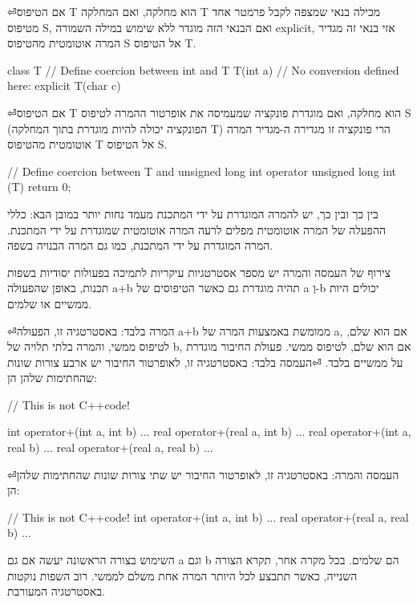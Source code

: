   \begin{ציינון}
⏎אם הטיפוס T הוא מחלקה, ואם המחלקה T מכילה בנאי שמצפה לקבל פרמטר אחד מטיפוס S, ואם הבנאי הזה מוגדר ללא שימוש במילה השמורה explicit, אזי בנאי זה מגדיר המרה אוטומטית מהטיפוס S אל הטיפוס T.
    \end{ציינון}

      class T {
        // Define coercion between int and T
        T(int a) {}
        // No conversion defined here:
        explicit T(char c) {}
      }

      \begin{ציינון}
⏎אם הטיפוס T הוא מחלקה, ואם מוגדרת פונקציה שמעמיסה את אופרטור ההמרה לטיפוס S (הפונקציה יכולה להיות מוגדרת בתוך המחלקה T) הרי פונקציה זו מגדירה ה-מגדיר המרה אוטומטית מהטיפוס T אל הטיפוס S.
    \end{ציינון}

      // Define coercion between T and unsigned long int
      operator unsigned long int (T) {
        return 0;
      }

      בין כך ובין כך, יש להמרה המוגדרת על ידי המתכנת מעמד נחות יותר במובן הבא: כללי ההפעלה של המרה אוטומטית מפלים לרעה המרה אוטומטית שמוגדרת על ידי המתכנת. המרה המוגדרת על ידי המתכנת, כמו גם המרה הבנויה בשפה.

      צירוף של העמסה והמרה
      יש מספר אסטרטגיות עיקריות לתמיכה בפעולות יסודיות בשפות תכנות, באופן שהפעולה a+b תהיה מוגדרת גם כאשר הטיפוסים של a וְ-b יכולים היות ממשיים או שלמים.
      \begin{ציינון}
⏎המרה בלבד: באסטרטגיה זו, הפעולה a+b ממומשת באמצעות המרה של a, אם הוא שלם, לטיפוס ממשי, והמרה בלתי תלויה של b, אם הוא שלם, לטיפוס ממשי. פעולת החיבור מוגדרת על ממשיים בלבד.
⏎העמסה בלבד: באסטרטגיה זו, לאופרטור החיבור יש ארבע צורות שונות שהחתימות שלהן הן:
    \end{ציינון}

      // This is not C++code!

      int operator+(int a, int b) {...}
      real operator+(real a, int b) {...}
      real operator+(int a, real b) {...}
      real operator+(real a, real b) {...}

      \begin{ציינון}
⏎העמסה והמרה: באסטרטגיה זו, לאופרטור החיבור יש שתי צורות שונות שהחתימות שלהן הן:
    \end{ציינון}

      // This is not C++code!
      int operator+(int a, int b) {...}
      real operator+(real a, real b) {...}

      השימוש בצורה הראשונה יעשה אם גם a וגם b הם שלמים. בכל מקרה אחר, תקרא הצורה השנייה, כאשר תתבצע לכל היותר המרה אחת משלם לממשי.
      רוב השפות נוקטות באסטרטגיה המעורבת.


